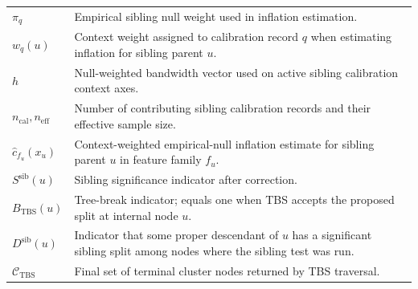 {\begin{longtable}{@{}p{}p{}@{}}
$\pi_q$ & Empirical sibling null weight used in inflation estimation. \\
$w_q(u)$ & Context weight assigned to calibration record $q$ when estimating inflation for sibling parent $u$. \\
$h$ & Null-weighted bandwidth vector used on active sibling calibration context axes. \\
$n_{\mathrm{cal}}, n_{\mathrm{eff}}$ & Number of contributing sibling calibration records and their effective sample size. \\
$\hat c_{f_u}(x_u)$ & Context-weighted empirical-null inflation estimate for sibling parent $u$ in feature family $f_u$. \\
$S^{\mathrm{sib}}(u)$ & Sibling significance indicator after correction. \\
$B_{\mathrm{TBS}}(u)$ & Tree-break indicator; equals one when TBS accepts the proposed split at internal node $u$. \\
$D^{\mathrm{sib}}(u)$ & Indicator that some proper descendant of $u$ has a significant sibling split among nodes where the sibling test was run. \\
$\mathcal{C}_{\mathrm{TBS}}$ & Final set of terminal cluster nodes returned by TBS traversal. \\
\end{longtable}
}
